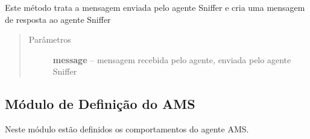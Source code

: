 \documentclass[letterpaper,10pt,brazil]{sphinxmanual}
\begin{document}
\begin{fulllineitems}
\begin{fulllineitems}
\begin{quote}
\begin{description}
\end{description}\end{quote}

\end{fulllineitems}


\begin{fulllineitems}
\label{api:pade.core.agent.AgentProtocol.sniffer_message}
Este método trata a mensagem enviada pelo agente Sniffer
e cria uma mensagem de resposta ao agente Sniffer
\begin{quote}\begin{description}
\item[{Parâmetros}] \leavevmode
\textbf{message} -- mensagem recebida pelo agente, enviada pelo
agente Sniffer

\end{description}\end{quote}

\end{fulllineitems}


\end{fulllineitems}

\label{api:module-pade.core.ams}

\subsection{Módulo de Definição do AMS}
\label{api:modulo-de-definicao-do-ams}
Neste módulo estão definidos os comportamentos do agente
AMS.
\end{document}
